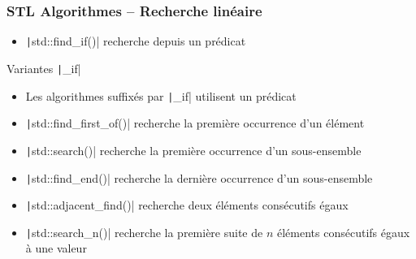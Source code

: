 \documentclass[C++.tex]{subfiles}
\begin{document}
\begin{frame}[fragile]
	\frametitle{STL Algorithmes -- Recherche linéaire}
	\begin{itemize}
		\item \texttt|std::find_if()| recherche depuis un prédicat
	\end{itemize}

	\begin{block}{Variantes \texttt|_if|}
		\begin{itemize}
			\item Les algorithmes suffixés par \texttt|_if| utilisent un prédicat
		\end{itemize}
	\end{block}

	\begin{itemize}
		\item \texttt|std::find_first_of()| recherche la première occurrence d'un élément
		\item \texttt|std::search()| recherche la première occurrence d'un sous-ensemble
		\item \texttt|std::find_end()| recherche la dernière occurrence d'un sous-ensemble
		\item \texttt|std::adjacent_find()| recherche deux éléments consécutifs égaux
		\item \texttt|std::search_n()| recherche la première suite de $n$ éléments consécutifs égaux à une valeur
	\end{itemize}


\end{frame}
\end{document}
